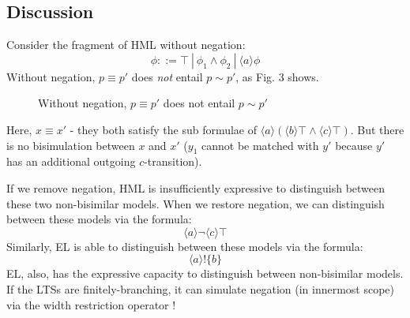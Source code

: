 \documentclass[smallextended]{svjour3}       %
\numberwithin{subcase}{mycase}
\def\fOr {\ | \ }
\begin{document}
\subsection{Discussion}
Consider the fragment of HML without negation:
\[
\phi ::= \top \fOr \phi_1 \land \phi_2  \fOr \langle a \rangle \phi
\]
Without negation, $p \equiv p'$ does \emph{not} entail $p \sim p'$, as Fig. 3 shows.
\begin{figure}[h]
\centering
{}
\caption{Without negation, $p \equiv p'$ does not entail $p \sim p'$}
\end{figure}
Here, $x \equiv x'$ - they both satisfy the sub formulae of $\langle a \rangle (\langle b \rangle \top \land \langle c \rangle \top)$.
But there is no bisimulation between $x$ and $x'$ ($y_1$ cannot be matched with $y'$ because $y'$ has an additional outgoing $c$-transition). 

If we remove negation, HML  is insufficiently expressive to distinguish between these two non-bisimilar models.
When we restore negation, we can distinguish between these models via the formula:
\[
\langle a \rangle \neg \langle c \rangle \top
\]
Similarly, EL is able to distinguish between these models via the formula:
\[
\langle a \rangle ! \{b\}
\]
EL, also, has the expressive capacity to distinguish between non-bisimilar models. If the LTSs are finitely-branching, it can simulate negation (in innermost scope) via the width restriction operator !
\end{document}
